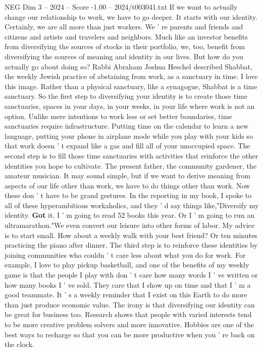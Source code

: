 \begin{textsample}{NEG Dim 3 – 2024 – Score -1.00 – 2024/t003041.txt}
If we want to actually change our relationship to work, we have to go deeper.
It starts with our identity.
Certainly, we are all more than just workers.
We ' re parents and friends and citizens and artists and travelers and neighbors.
Much like an investor benefits from diversifying the sources of stocks in their portfolio, we, too, benefit from diversifying the sources of meaning and identity in our lives.
But how do you actually go about doing so?
Rabbi Abraham Joshua Heschel described Shabbat, the weekly Jewish practice of abstaining from work, as a sanctuary in time.
I love this image.
Rather than a physical sanctuary, like a synagogue, Shabbat is a time sanctuary.
So the first step to diversifying your identity is to create those time sanctuaries, spaces in your days, in your weeks, in your life where work is not an option.
Unlike mere intentions to work less or set better boundaries, time sanctuaries require infrastructure.
Putting time on the calendar to learn a new language, putting your phone in airplane mode while you play with your kids so that work doesn ' t expand like a gas and fill all of your unoccupied space.
The second step is to fill those time sanctuaries with activities that reinforce the other identities you hope to cultivate.
The present father, the community gardener, the amateur musician.
It may sound simple, but if we want to derive meaning from aspects of our life other than work, we have to do things other than work.
Now these don ' t have to be grand gestures.
In the reporting in my book, I spoke to all of these hyperambitious workaholics, and they ' d say things like,"Diversify my identity. \textbf{Got} it.
I ' m going to read 52 books this year.
Or I ' m going to run an ultramarathon."We even convert our leisure into other forms of labor.
My advice is to start small.
How about a weekly walk with your best friend?
Or ten minutes practicing the piano after dinner.
The third step is to reinforce these identities by joining communities who couldn ' t care less about what you do for work.
For example, I love to play pickup basketball, and one of the benefits of my weekly game is that the people I play with don ' t care how many words I ' ve written or how many books I ' ve sold.
They care that I show up on time and that I ' m a good teammate.
It ' s a weekly reminder that I exist on this Earth to do more than just produce economic value.
The irony is that diversifying our identity can be great for business too.
Research shows that people with varied interests tend to be more creative problem solvers and more innovative.
Hobbies are one of the best ways to recharge so that you can be more productive when you ' re back on the clock.

\end{textsample}

